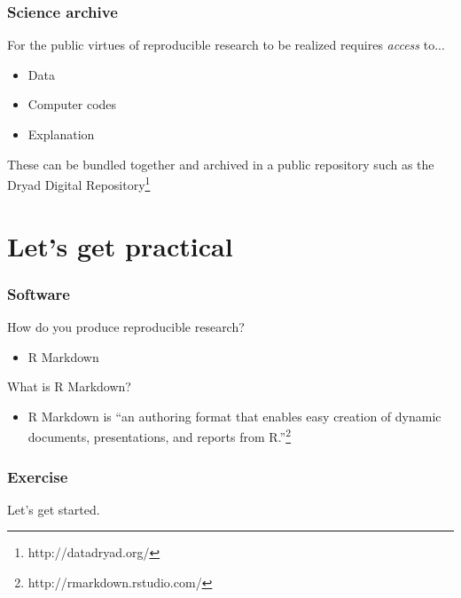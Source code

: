 \documentclass[10pt]{beamer}
\theoremstyle{exercise}
\begin{document}
\begin{frame}[fragile]
  \frametitle{Science archive}
  
{\Large For the public virtues of reproducible research to be realized requires \textit{access} to...}

\vspace{5mm}
  
\begin{itemize}
  \item Data
  \item Computer codes
  \item Explanation
\end{itemize}

\vspace{3mm}

These can be bundled together and archived in a public repository such as the Dryad Digital Repository\footnote{http://datadryad.org/}
  
\end{frame}

\section{Let's get practical}
\begin{frame}[fragile]
  \frametitle{Software}
  
{\Large How do you produce reproducible research?}

\vspace{5mm}
  
\begin{itemize}
  \item R Markdown
\end{itemize}

\vspace{10mm}

{\Large What is R Markdown?}

\vspace{3mm}
  
\begin{itemize}
  \item R Markdown is ``an authoring format that enables easy creation of dynamic documents, presentations, and reports from R.''\footnote{http://rmarkdown.rstudio.com/}
\end{itemize}

\end{frame}

\begin{frame}[fragile]
  \frametitle{Exercise}
  
{\Large \center Let's get started.}

\end{frame}
\end{document}

